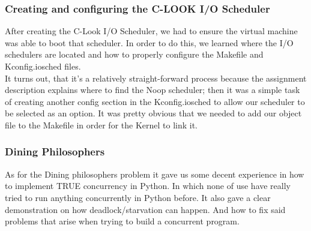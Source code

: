 \documentclass{article}
\begin{document}
    \subsubsection{Creating and configuring the C-LOOK I/O Scheduler}
    After creating the C-Look I/O Scheduler, we had to ensure the virtual machine was able to boot that scheduler. In order to do this, we learned where the I/O schedulers are located and how to properly configure the Makefile and Kconfig.iosched files.\\

    It turns out, that it's a relatively straight-forward process because the assignment description explains where to find the Noop scheduler; then it was a simple task of creating another config section in the Kconfig.iosched to allow our scheduler to be selected as an option. It was pretty obvious that we needed to add our object file to the Makefile in order for the Kernel to link it.

    \subsubsection{Dining Philosophers}
        As for the Dining philosophers problem it gave us some decent experience in how to implement TRUE concurrency in Python. In which none of use have really tried to run anything concurrently in Python before. It also gave a clear demonstration on how deadlock/starvation can happen. And how to fix said problems that arise when trying to build a concurrent program.
\end{document}
